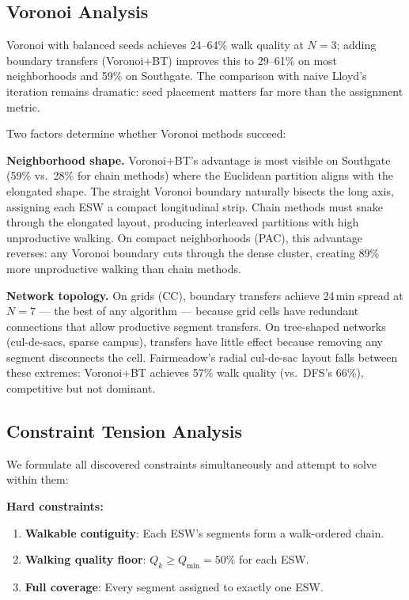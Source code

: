 \documentclass[conference]{IEEEtran}
\begin{document}
\subsection{Voronoi Analysis}
\label{sec:voronoi-results}

Voronoi with balanced seeds achieves 24--64\% walk quality at $N = 3$; adding boundary transfers (Voronoi+BT) improves this to 29--61\% on most neighborhoods and 59\% on Southgate. The comparison with naive Lloyd's iteration remains dramatic: seed placement matters far more than the assignment metric.

Two factors determine whether Voronoi methods succeed:

\textbf{Neighborhood shape.} Voronoi+BT's advantage is most visible on Southgate (59\% vs.\ 28\% for chain methods) where the Euclidean partition aligns with the elongated shape. The straight Voronoi boundary naturally bisects the long axis, assigning each ESW a compact longitudinal strip. Chain methods must snake through the elongated layout, producing interleaved partitions with high unproductive walking. On compact neighborhoods (PAC), this advantage reverses: any Voronoi boundary cuts through the dense cluster, creating 89\% more unproductive walking than chain methods.

\textbf{Network topology.} On grids (CC), boundary transfers achieve 24\,min spread at $N = 7$ --- the best of any algorithm --- because grid cells have redundant connections that allow productive segment transfers. On tree-shaped networks (cul-de-sacs, sparse campus), transfers have little effect because removing any segment disconnects the cell. Fairmeadow's radial cul-de-sac layout falls between these extremes: Voronoi+BT achieves 57\% walk quality (vs.\ DFS's 66\%), competitive but not dominant.

\subsection{Constraint Tension Analysis}
\label{sec:constraint-results}

We formulate all discovered constraints simultaneously and attempt to solve within them:

\textbf{Hard constraints:}
\begin{enumerate}
\item \textbf{Walkable contiguity}: Each ESW's segments form a walk-ordered chain.
\item \textbf{Walking quality floor}: $Q_k \geq Q_{\min} = 50\%$ for each ESW.
\item \textbf{Full coverage}: Every segment assigned to exactly one ESW.
\end{enumerate}
\end{document}

